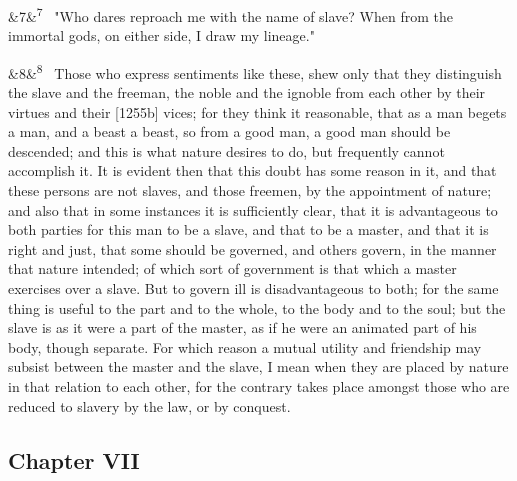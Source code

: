 \documentclass[12pt]{article}
\newcommand{\para}[1][]{\par\noindent\ifx&#1&\else\textsuperscript{\footnotesize #1}~\fi}
\begin{document}
\para[7] "Who dares reproach me with the name of slave? When from the immortal gods, on either side, I draw my lineage."

\para[8] Those who express sentiments like these, shew only that they distinguish the slave and the freeman, the noble and the ignoble from each other by their virtues and their [1255b] vices; for they think it reasonable, that as a man begets a man, and a beast a beast, so from a good man, a good man should be descended; and this is what nature desires to do, but frequently cannot accomplish it. It is evident then that this doubt has some reason in it, and that these persons are not slaves, and those freemen, by the appointment of nature; and also that in some instances it is sufficiently clear, that it is advantageous to both parties for this man to be a slave, and that to be a master, and that it is right and just, that some should be governed, and others govern, in the manner that nature intended; of which sort of government is that which a master exercises over a slave. But to govern ill is disadvantageous to both; for the same thing is useful to the part and to the whole, to the body and to the soul; but the slave is as it were a part of the master, as if he were an animated part of his body, though separate. For which reason a mutual utility and friendship may subsist between the master and the slave, I mean when they are placed by nature in that relation to each other, for the contrary takes place amongst those who are reduced to slavery by the law, or by conquest.

\subsection*{Chapter VII}
\end{document}
